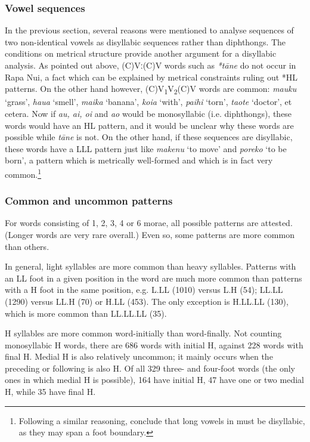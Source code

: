 \subsubsection{Vowel sequences}\label{sec:2.3.2.3}

In the previous section, several reasons were mentioned to analyse sequences of two non-identical vowels as disyllabic sequences rather than diphthongs. The conditions on metrical structure provide another argument for a disyllabic analysis. As pointed out above, (C)Vː(C)V words such as \textit{*tāne} do not occur in Rapa Nui, a fact which can be explained by metrical constraints ruling out *HL patterns. On the other hand however, (C)V\textsubscript{1}V\textsubscript{2}(C)V words are common: \textit{mauku} ‘grass’, \textit{hau{\ꞌ}a} ‘smell’, \textit{maika} ‘banana’, \textit{koia} ‘with’, \textit{paihi} ‘torn’, \textit{taote} ‘doctor’, et cetera. Now if \textit{au, ai, oi} and \textit{ao} would be monosyllabic (i.e. diphthongs), these words would have an HL pattern, and it would be unclear why these words are possible while \textit{tāne} is not. On the other hand, if these sequences are disyllabic, these words have a LLL pattern just like \textit{makenu} ‘to move’ and \textit{poreko} ‘to be born’, a pattern which is metrically well-formed and which is in fact very common.\footnote{\label{fn:50}Following a similar reasoning, \citet{AndersonOtsuka2006} conclude that long vowels in  must be disyllabic, as they may span a foot boundary.} 

\subsubsection{Common and uncommon patterns}\label{sec:2.3.2.4}

For words consisting of 1, 2, 3, 4 or 6 morae, all possible patterns are attested. (Longer words are very rare overall.) Even so, some patterns are more common than others.

In general, light syllables are more common than heavy syllables. Patterns with an LL foot in a given position in the word are much more common than patterns with a H foot in the same position, e.g. L.LL (1010) versus L.H (54); LL.LL (1290) versus LL.H (70) or H.LL (453). The only exception is H.LL.LL (130), which is more common than LL.LL.LL (35).

H syllables are more common word-initially than word-finally. Not counting monosyllabic H words, there are 686 words with initial H, against 228 words with final H. Medial H is also relatively uncommon; it mainly occurs when the preceding or following  is also H. Of all 329 three- and four-foot words (the only ones in which medial H is possible), 164 have initial H, 47 have one or two medial H, while 35 have final H.

